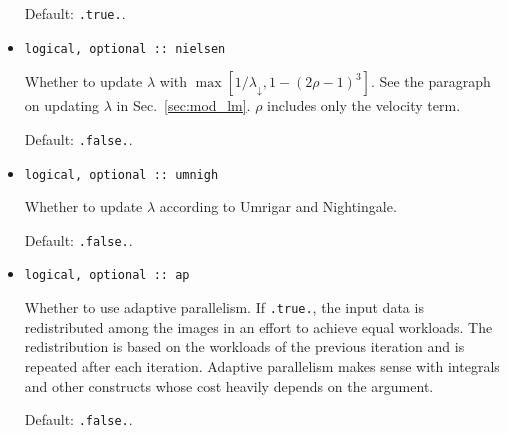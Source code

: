 \documentclass{article}
\begin{document}
\begin{itemize}
  Default: \texttt{.true.}.
\item 
\begin{verbatim}
logical, optional :: nielsen
\end{verbatim}
  Whether to update $\lambda$ with $\max[1/\lambda_\downarrow,1-(2\rho-1)^3]$. See the paragraph on updating $\lambda$ in Sec.~\ref{sec:mod_lm}. $\rho$ includes only the velocity term.

  Default: \texttt{.false.}.
\item 
\begin{verbatim}
logical, optional :: umnigh
\end{verbatim}
  Whether to update $\lambda$ according to Umrigar and Nightingale.

  Default: \texttt{.false.}.
\item 
\begin{verbatim}
logical, optional :: ap
\end{verbatim}
  Whether to use adaptive parallelism. If \verb+.true.+, the input data is redistributed among the images in an effort to achieve equal workloads. The redistribution is based on the workloads of the previous iteration and is repeated after each iteration. Adaptive parallelism makes sense with integrals and other constructs whose cost heavily depends on the argument.

  Default: \verb+.false.+.
\end{itemize}
\end{document}
